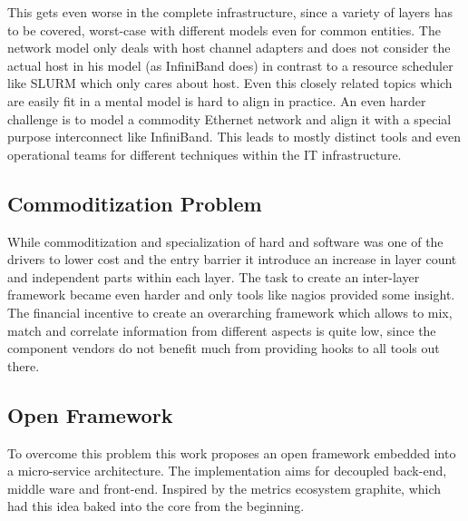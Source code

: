 This gets even worse in the complete infrastructure, since a variety of layers has to be covered, worst-case with different models even for common entities.
The network model only deals with host channel adapters and does not consider the actual host in his model (as InfiniBand does) in contrast to a resource
scheduler like SLURM which only cares about host. Even this closely related topics which are easily fit in a mental model is hard to align in practice.
An even harder challenge is to model a commodity Ethernet network and align it with a special purpose interconnect like InfiniBand.
This leads to mostly distinct tools and even operational teams for different techniques within the IT infrastructure.

\subsection{Commoditization Problem}
While commoditization and specialization of hard and software was one of the drivers to lower cost and the entry barrier it introduce an increase in layer count and
independent parts within each layer. The task to create an inter-layer framework became even harder and only tools like \gls{nagios} provided some insight.
The financial incentive to create an overarching framework which allows to mix, match and correlate information from different aspects is quite low, since the component vendors
do not benefit much from providing hooks to all tools out there.

\subsection{Open Framework}
To overcome this problem this work proposes an open framework embedded into a micro-service architecture. The implementation aims for decoupled back-end, middle ware and front-end.
Inspired by the metrics ecosystem graphite, which had this idea baked into the core from the beginning.